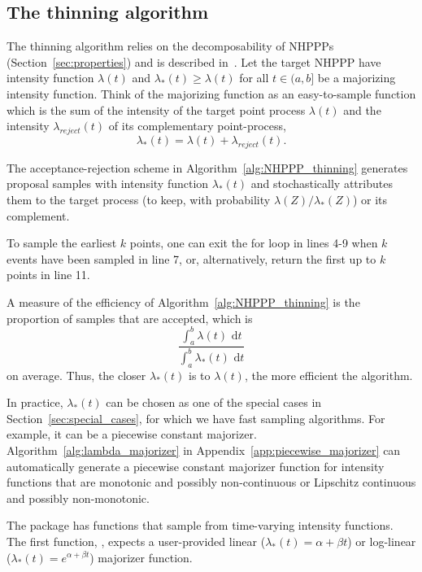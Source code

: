 \documentclass[article,nojss]{jss}\usepackage[]{graphicx}\usepackage[]{xcolor}
\newcommand{\fct}[1]{\code{#1()}}
\begin{document}
\subsection{The thinning algorithm}\label{sec:thinning}
The thinning algorithm relies on the decomposability of NHPPPs (Section~\ref{sec:properties}) and is described in~\cite{lewis1979thinning}. Let the target NHPPP have intensity function $\lambda(t)$ and $\lambda_*(t) \ge \lambda(t)$ for all $t \in (a, b]$ be a majorizing intensity function. Think of the majorizing function as an easy-to-sample function which is the sum of the intensity of the target point process $\lambda(t)$ and the intensity $\lambda_{reject}(t)$ of its complementary point-process,
$$\lambda_*(t) = \lambda(t) + \lambda_{reject}(t).$$

The acceptance-rejection scheme in Algorithm~\ref{alg:NHPPP_thinning} generates proposal samples with intensity function $\lambda_*(t)$ and stochastically attributes them to the target process (to keep, with probability $\lambda(Z)/\lambda_*(Z)$) or its complement.



To sample the earliest $k$ points, one can exit the for loop in lines 4-9 when $k$ events have been sampled in line 7, or, alternatively, return the first up to $k$ points in line 11.

A measure of the efficiency of Algorithm~\ref{alg:NHPPP_thinning} is the proportion of samples that are accepted, which is
\begin{equation}\label{eq:thinning-efficiency}
\frac{\int_a^b{\lambda(t) \textrm{ d}t}}{\int_a^b{\lambda_*(t) \textrm{ d}t}}
\end{equation}
on average. Thus, the closer $\lambda_*(t)$ is to $\lambda(t)$, the more efficient the algorithm.

In practice, $\lambda_*(t)$ can be chosen as one of the special cases in Section~\ref{sec:special_cases}, for which we have fast sampling algorithms. For example, it can be a piecewise constant majorizer. Algorithm~\ref{alg:lambda_majorizer} 
in Appendix~\ref{app:piecewise_majorizer} can automatically generate a piecewise constant majorizer function for intensity functions that are monotonic and possibly non-continuous or Lipschitz continuous and possibly non-monotonic.

The  package has functions that sample from time-varying intensity functions. The first function, \fct{draw\_intensity}, expects a user-provided linear ($\lambda_*(t) = \alpha + \beta t$) or log-linear ($\lambda_*(t) = e^{\alpha + \beta t}$) majorizer function.
\end{document}
